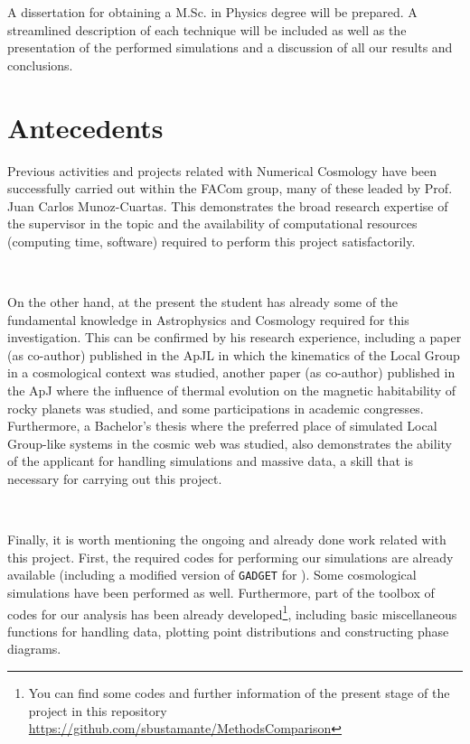 \documentclass[a4,useAMS,usenatbib,usegraphicx,12pt]{article}
\begin{document}
A dissertation for obtaining a M.Sc. in Physics degree will be prepared. A
streamlined description of each technique will be included as well as the 
presentation of the performed simulations and a discussion of all our results
and conclusions.


\section{Antecedents}
Previous activities and projects related with Numerical Cosmology have been 
successfully carried out within the FACom group, many of these leaded by Prof. 
Juan Carlos Munoz-Cuartas. This demonstrates the broad research expertise of the 
supervisor in the topic and the availability of computational resources (computing
time, software) required to perform this project satisfactorily.

\

On the other hand, at the present the student has already some of the fundamental 
knowledge in Astrophysics and Cosmology required for this investigation. This can 
be confirmed by his research experience, including a paper (as co-author) 
published in the ApJL in which the kinematics of the Local Group in a cosmological 
context was studied, another paper (as co-author) published in the ApJ where the 
influence of thermal evolution on the magnetic habitability of rocky planets was 
studied, and some participations in academic congresses. Furthermore, a Bachelor’s 
thesis where the preferred place of simulated Local Group-like systems in the 
cosmic web was studied, also demonstrates the ability of the applicant for 
handling simulations and massive data, a skill that is necessary for carrying out 
this project.

\

Finally, it is worth mentioning the ongoing and already done work related with 
this project. First, the required codes for performing our simulations are already
available (including a modified version of \texttt{GADGET} for \VPH). Some
cosmological simulations have been performed as well. Furthermore, part of the 
toolbox of codes for our analysis has been already developed\footnote{You can 
find some codes and further information of the present stage of the project in 
this repository \url{https://github.com/sbustamante/MethodsComparison}}, 
including basic miscellaneous functions for handling data, plotting point 
distributions and constructing phase diagrams.
\end{document}
